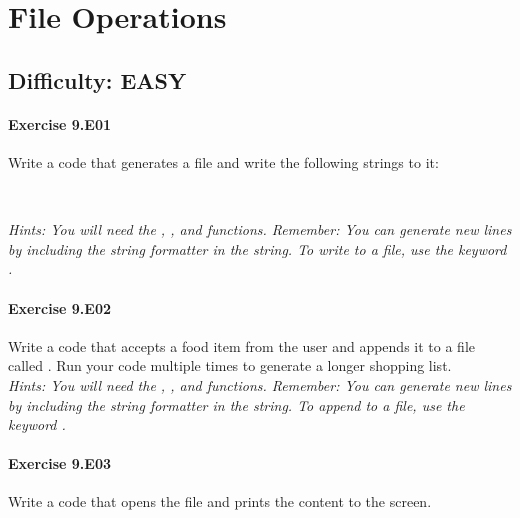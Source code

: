 \chapter{File Operations}\label{CHAP_FileOperations}

\section{Difficulty: EASY}


\subsubsection*{Exercise 9.E01}

Write a code that generates a file {} and write the following
strings to it:
\begin{flushleft}
	{}\\
	{}
\end{flushleft}


\textit{Hints:
You will need the {}, {}, and {} functions. Remember: You can generate new lines by including the string formatter {} in the string. To write to a file, use the keyword {}.}\\[1cm]


\subsubsection*{Exercise 9.E02}
Write a code that accepts a food item from the user and appends it to a file called
{}. Run your code multiple times to generate a longer
shopping list.\\


\textit{Hints:
You will need the {}, {}, and {} functions. Remember: You can generate new lines by including the string formatter {} in the string. To append to a file, use the keyword {}.}\\[1cm]


\subsubsection*{Exercise 9.E03}
Write a code that opens the file {} and prints the content
to the screen.\\

